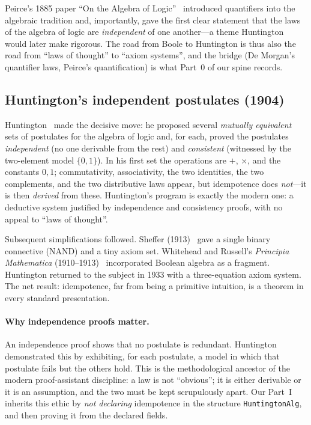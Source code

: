 \documentclass[11pt]{article}
\theoremstyle{definition}
\begin{document}
Peirce's 1885 paper ``On the Algebra of Logic''~\cite{peirce1885} introduced
quantifiers into the algebraic tradition and, importantly, gave the first clear
statement that the laws of the algebra of logic are \emph{independent} of one
another---a theme Huntington would later make rigorous. The road from Boole to
Huntington is thus also the road from ``laws of thought'' to ``axiom
systems'', and the bridge (De Morgan's quantifier laws, Peirce's
quantification) is what Part~0 of our spine records.

\subsection{Huntington's independent postulates (1904)}
\label{sec:hist-huntington}

Huntington~\cite{huntington1904} made the decisive move: he proposed several
\emph{mutually equivalent} sets of postulates for the algebra of logic and, for
each, proved the postulates \emph{independent} (no one derivable from the
rest) and \emph{consistent} (witnessed by the two-element model
$\{0,1\}$). In his first set the operations are $+$, $\times$, and the
constants $0,1$; commutativity, associativity, the two identities, the two
complements, and the two distributive laws appear, but idempotence does
\emph{not}---it is then \emph{derived} from these. Huntington's program is
exactly the modern one: a deductive system justified by independence and
consistency proofs, with no appeal to ``laws of thought''.

Subsequent simplifications followed. Sheffer (1913)~\cite{sheffer1913} gave a
single binary connective (NAND) and a tiny axiom set. Whitehead and Russell's
\emph{Principia Mathematica} (1910--1913)~\cite{pm1910} incorporated Boolean
algebra as a fragment. Huntington returned to the subject in 1933 with a
three-equation axiom system. The net result: idempotence, far from being a
primitive intuition, is a theorem in every standard presentation.

\paragraph{Why independence proofs matter.}
An independence proof shows that no postulate is redundant. Huntington
demonstrated this by exhibiting, for each postulate, a model in which that
postulate fails but the others hold. This is the methodological ancestor of the
modern proof-assistant discipline: a law is not ``obvious''; it is either
derivable or it is an assumption, and the two must be kept scrupulously apart.
Our Part~I inherits this ethic by \emph{not declaring} idempotence in the
structure \texttt{HuntingtonAlg}, and then proving it from the declared fields.
\end{document}
